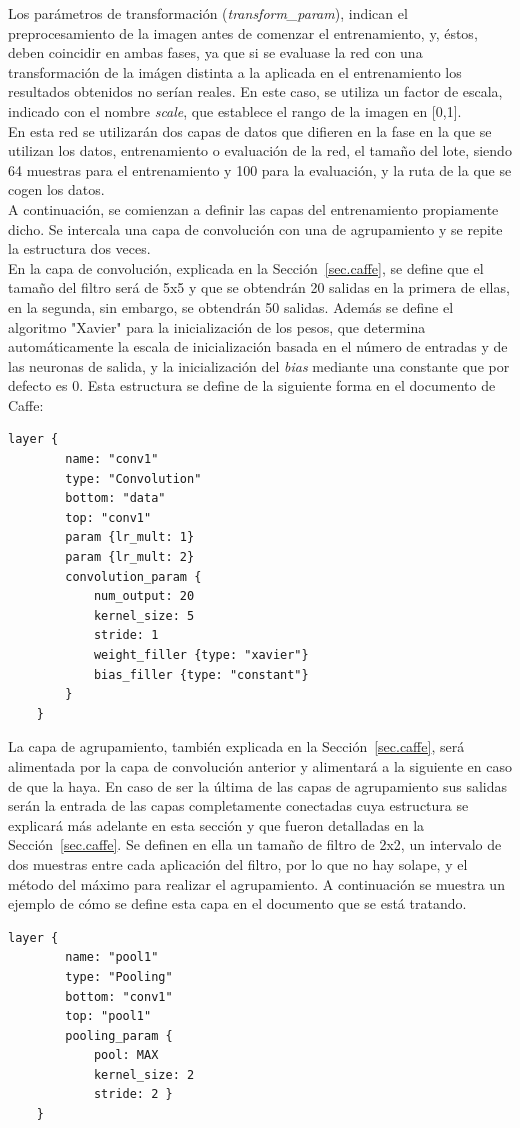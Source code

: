 	Los parámetros de transformación (\textit{transform\_param}), indican el preprocesamiento de la imagen antes de comenzar el entrenamiento, y, éstos, deben coincidir en ambas fases, ya que si se evaluase la red con una transformación de la imágen distinta a la aplicada en el entrenamiento los resultados obtenidos no serían reales. En este caso, se utiliza un factor de escala, indicado con el nombre \textit{scale}, que establece el rango de la imagen en [0,1]. \\
	En esta red se utilizarán dos capas de datos que difieren en la fase en la que se utilizan los datos, entrenamiento o evaluación de la red, el tamaño del lote, siendo 64 muestras para el entrenamiento y 100 para la evaluación, y la ruta de la que se cogen los datos.\\
	
	A continuación, se comienzan a definir las capas del entrenamiento propiamente dicho. Se intercala una capa de convolución con una de agrupamiento y se repite la estructura dos veces.\\
	
	En la capa de convolución, explicada en la Sección~\ref{sec.caffe}, se define que el tamaño del filtro será de 5x5 y que se obtendrán 20 salidas en la primera de ellas, en la segunda, sin embargo, se obtendrán 50 salidas. Además se define el algoritmo "Xavier" para la inicialización de los pesos, que determina automáticamente la escala de inicialización basada en el número de entradas y de las neuronas de salida, y la inicialización del \textit{bias} mediante una constante que por defecto es 0. Esta estructura se define de la siguiente forma en el documento de Caffe:
	\vspace{10pt}
	\begin{lstlisting}[frame=single]
	layer {
		name: "conv1"
		type: "Convolution"
		bottom: "data"
		top: "conv1"
		param {lr_mult: 1}
		param {lr_mult: 2}
		convolution_param {
			num_output: 20
			kernel_size: 5
			stride: 1
			weight_filler {type: "xavier"}
			bias_filler {type: "constant"}
		}
	}	
	\end{lstlisting}
	
	La capa de agrupamiento, también explicada en la Sección~\ref{sec.caffe}, será alimentada por la capa de convolución anterior y alimentará a la siguiente en caso de que la haya. En caso de ser la última de las capas de agrupamiento sus salidas serán la entrada de las capas completamente conectadas cuya estructura se explicará más adelante en esta sección y que fueron detalladas en la Sección~\ref{sec.caffe}. Se definen en ella un tamaño de filtro de 2x2, un intervalo de dos muestras entre cada aplicación del filtro, por lo que no hay solape, y el método del máximo para realizar el agrupamiento. A continuación se muestra un ejemplo de cómo se define esta capa en el documento que se está tratando.
	\vspace{10pt}
	\begin{lstlisting}[frame=single]
	layer {
		name: "pool1"
		type: "Pooling"
		bottom: "conv1"
		top: "pool1"
		pooling_param {
			pool: MAX
			kernel_size: 2
			stride: 2 }
	}	
	\end{lstlisting}


